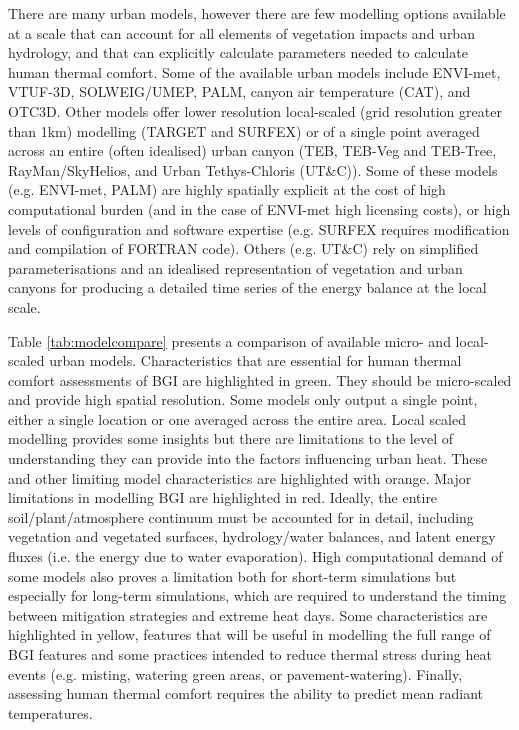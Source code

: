 There are many urban models, however there are few modelling options available at a scale that can account for all elements of vegetation impacts and urban hydrology, and that can explicitly calculate parameters needed to calculate human thermal comfort. Some of the available urban models include ENVI-met\cite{Bruse1999}, VTUF-3D\textbf{\cite{Nice2018a}}, SOLWEIG/UMEP\cite{Lindberg2018}, PALM\cite{Dominik2019}, canyon air temperature (CAT)\cite{Erell2006}, and OTC3D\cite{Nazarian2018}. Other models offer lower resolution local-scaled (grid resolution greater than 1km) modelling (TARGET\textbf{\cite{Broadbent2019c}} and SURFEX\cite{Masson2013}) or of a single point averaged across an entire (often idealised) urban canyon (TEB\cite{Masson2002a},  TEB-Veg and TEB-Tree\cite{Lemonsu2012,Redon2020}, RayMan\cite{Matzarakis2010}/SkyHelios\cite{Matzarakis2011}, and Urban Tethys-Chloris (UT\&C)\textbf{\cite{Meili2020}}). Some of these models (e.g. ENVI-met, PALM) are highly spatially explicit at the cost of high computational burden (and in the case of ENVI-met high licensing costs), or high levels of configuration and software expertise (e.g. SURFEX requires modification and compilation of FORTRAN code). Others (e.g. UT\&C) rely on simplified parameterisations and an idealised representation of vegetation and urban canyons for producing a detailed time series of the energy balance at the local scale. 

Table \ref{tab:modelcompare} presents a comparison of available micro- and local-scaled urban models. Characteristics that are essential for human thermal comfort assessments of BGI are highlighted in green. They should be micro-scaled and provide high spatial resolution. Some models only output a single point, either a single location or one averaged across the entire area.  Local scaled modelling provides some insights but there are limitations to the level of understanding they can provide into the factors influencing urban heat. These and other limiting model characteristics are highlighted with orange. Major limitations in modelling BGI are highlighted in red. Ideally, the entire soil/plant/atmosphere continuum must be accounted for in detail, including vegetation and vegetated surfaces, hydrology/water balances, and latent energy fluxes (i.e. the energy due to water evaporation). High computational demand of some models also proves a limitation both for short-term simulations but especially for long-term simulations, which are required to understand the timing between mitigation strategies and extreme heat days. Some characteristics are highlighted in yellow, features that will be useful in modelling the full range of BGI features and some practices intended to reduce thermal stress during heat events (e.g. misting, watering green areas, or pavement-watering). Finally, assessing human thermal comfort requires the ability to predict mean radiant temperatures.

